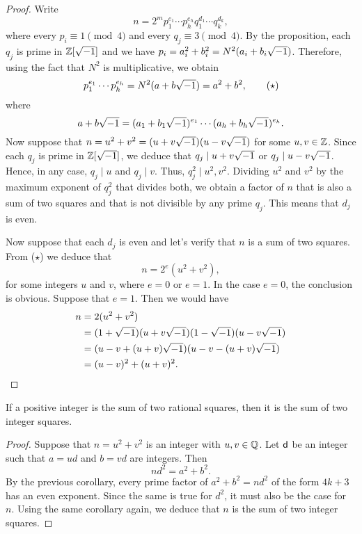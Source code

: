 \begin{proof}
    Write
    $$
        n=2^mp_1^{e_1}\cdots p_h^{e_h}q_1^{d_1}\cdots q_k^{d_k},
    $$
    where every $p_i\equiv1\pmod4$ and every $q_j\equiv3\pmod4$. By the proposition, each $q_j$ is prime in $\mathbb{Z}[\sqrt{-1}]$ and we have $p_i=a_i^2+b_i^2=N^2(a_i+b_i\sqrt{-1})$. Therefore, using the fact that $N^2$ is multiplicative, we obtain
    \begin{equation}
        p_1^{e_1}\cdots p_h^{e_h}=N^2(a+b\sqrt{-1})=a^2+b^2,
            \tag{$\star$}
    \end{equation}
    where
    $$
        a+b\sqrt{-1}=(a_1+b_1\sqrt{-1})^{e_1}\cdots(a_h+b_h\sqrt{-1})^{e_h}.
    $$
    Now suppose that $n=u^2+v^2=(u+v\sqrt{-1})(u-v\sqrt{-1})$ for some $u,v\in\mathbb{Z}$. Since each $q_j$ is prime in $\mathbb{Z}[\sqrt{-1}]$, we deduce that $q_j\mid u+v\sqrt{-1}$ or $q_j\mid u-v\sqrt{-1}$. Hence, in any case, $q_j\mid u$ and $q_j\mid v$. Thus, $q_j^2\mid u^2,v^2$. Dividing $u^2$ and $v^2$ by the maximum exponent of $q_j^2$ that divides both, we obtain a factor of $n$ that is also a sum of two squares and that is not divisible by any prime $q_j$. This means that $d_j$ is even.

    Now suppose that each $d_j$ is even and let's verify that $n$ is a sum of two squares. From ($\star$) we deduce that
    $$
        n=2^e(u^2+v^2),
    $$
    for some integers $u$ and $v$, where $e=0$ or $e=1$. In the case $e=0$, the conclusion is obvious. Suppose that $e=1$. Then we would have
    \begin{align*}
        n &= 2(u^2+v^2)\\
            &= (1+\sqrt{-1})(u+v\sqrt{-1})(1-\sqrt{-1})(u-v\sqrt{-1})\\
            &= (u-v+(u+v)\sqrt{-1})(u-v-(u+v)\sqrt{-1})\\
            &= (u-v)^2+(u+v)^2.
    \end{align*}
\end{proof}

\begin{cor}\label{cor:sum-of-two-rational-squares}
    If a positive integer is the sum of two rational squares, then it is the sum of two integer squares.
\end{cor}

\begin{proof}
    Suppose that $n=u^2+v^2$ is an integer with $u,v\in\mathbb{Q}$. Let $\mathsf d$ be an integer such that $a=ud$ and $b=vd$ are integers. Then
    $$
        nd^2=a^2+b^2.
    $$
    By the previous corollary, every prime factor of $a^2+b^2=nd^2$ of the form $4k+3$ has an even exponent. Since the same is true for $d^2$, it must also be the case for~$n$. Using the same corollary again, we deduce that $n$ is the sum of two integer squares.
\end{proof}


